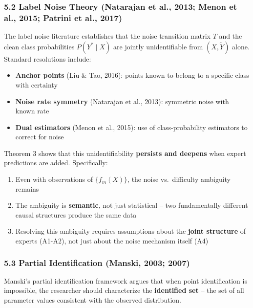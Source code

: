 \documentclass[
  12pt,
]{ctexart}
\providecommand{\tightlist}{%
  \setlength{\itemsep}{0pt}\setlength{\parskip}{0pt}}
\begin{document}
\subsubsection{5.2 Label Noise Theory (Natarajan et al., 2013; Menon et
al., 2015; Patrini et al.,
2017)}\label{label-noise-theory-natarajan-et-al.-2013-menon-et-al.-2015-patrini-et-al.-2017}

The label noise literature establishes that the noise transition matrix
\(T\) and the clean class probabilities \(P(Y^* \mid X)\) are jointly
unidentifiable from \((X, \tilde{Y})\) alone. Standard resolutions
include:

\begin{itemize}
\tightlist
\item
  \textbf{Anchor points} (Liu \& Tao, 2016): points known to belong to a
  specific class with certainty
\item
  \textbf{Noise rate symmetry} (Natarajan et al., 2013): symmetric noise
  with known rate
\item
  \textbf{Dual estimators} (Menon et al., 2015): use of
  class-probability estimators to correct for noise
\end{itemize}

Theorem 3 shows that this unidentifiability \textbf{persists and
deepens} when expert predictions are added. Specifically:

\begin{enumerate}
\def\labelenumi{\arabic{enumi}.}
\tightlist
\item
  Even with observations of \(\{f_m(X)\}\), the noise vs.~difficulty
  ambiguity remains
\item
  The ambiguity is \textbf{semantic}, not just statistical -- two
  fundamentally different causal structures produce the same data
\item
  Resolving this ambiguity requires assumptions about the \textbf{joint
  structure} of experts (A1-A2), not just about the noise mechanism
  itself (A4)
\end{enumerate}

\subsubsection{5.3 Partial Identification (Manski, 2003;
2007)}\label{partial-identification-manski-2003-2007}

Manski's partial identification framework argues that when point
identification is impossible, the researcher should characterize the
\textbf{identified set} -- the set of all parameter values consistent
with the observed distribution.
\end{document}
